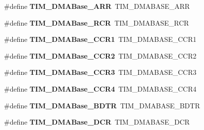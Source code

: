 \begin{DoxyCompactItemize}
\#define {\bfseries T\+I\+M\+\_\+\+D\+M\+A\+Base\+\_\+\+A\+RR}~T\+I\+M\+\_\+\+D\+M\+A\+B\+A\+S\+E\+\_\+\+A\+RR
\item 
\mbox{\label{group___h_a_l___t_i_m___aliased___defines_ga97f9edceee5c99b32aaa2c6daf849b7d}} 
\#define {\bfseries T\+I\+M\+\_\+\+D\+M\+A\+Base\+\_\+\+R\+CR}~T\+I\+M\+\_\+\+D\+M\+A\+B\+A\+S\+E\+\_\+\+R\+CR
\item 
\mbox{\label{group___h_a_l___t_i_m___aliased___defines_ga235a47fa47fd19594a111e6e48c0d5a2}} 
\#define {\bfseries T\+I\+M\+\_\+\+D\+M\+A\+Base\+\_\+\+C\+C\+R1}~T\+I\+M\+\_\+\+D\+M\+A\+B\+A\+S\+E\+\_\+\+C\+C\+R1
\item 
\mbox{\label{group___h_a_l___t_i_m___aliased___defines_ga0e2150dcd3afe31ecb793aa471b3b972}} 
\#define {\bfseries T\+I\+M\+\_\+\+D\+M\+A\+Base\+\_\+\+C\+C\+R2}~T\+I\+M\+\_\+\+D\+M\+A\+B\+A\+S\+E\+\_\+\+C\+C\+R2
\item 
\mbox{\label{group___h_a_l___t_i_m___aliased___defines_ga590c90085bd2b206b941dff2731fed74}} 
\#define {\bfseries T\+I\+M\+\_\+\+D\+M\+A\+Base\+\_\+\+C\+C\+R3}~T\+I\+M\+\_\+\+D\+M\+A\+B\+A\+S\+E\+\_\+\+C\+C\+R3
\item 
\mbox{\label{group___h_a_l___t_i_m___aliased___defines_ga5e84a16e7d8ea369a3a55bb6fe1f2171}} 
\#define {\bfseries T\+I\+M\+\_\+\+D\+M\+A\+Base\+\_\+\+C\+C\+R4}~T\+I\+M\+\_\+\+D\+M\+A\+B\+A\+S\+E\+\_\+\+C\+C\+R4
\item 
\mbox{\label{group___h_a_l___t_i_m___aliased___defines_gaaff22bbf3091c47783c1c68b648c8605}} 
\#define {\bfseries T\+I\+M\+\_\+\+D\+M\+A\+Base\+\_\+\+B\+D\+TR}~T\+I\+M\+\_\+\+D\+M\+A\+B\+A\+S\+E\+\_\+\+B\+D\+TR
\item 
\mbox{\label{group___h_a_l___t_i_m___aliased___defines_ga59e2206e4e03b9d55c9fb5a24e29b01c}} 
\#define {\bfseries T\+I\+M\+\_\+\+D\+M\+A\+Base\+\_\+\+D\+CR}~T\+I\+M\+\_\+\+D\+M\+A\+B\+A\+S\+E\+\_\+\+D\+CR
\item 
\mbox{\label{group___h_a_l___t_i_m___aliased___defines_gaf2b823d37e722f9f856c654fa35eff26}} 

\end{DoxyCompactItemize}
